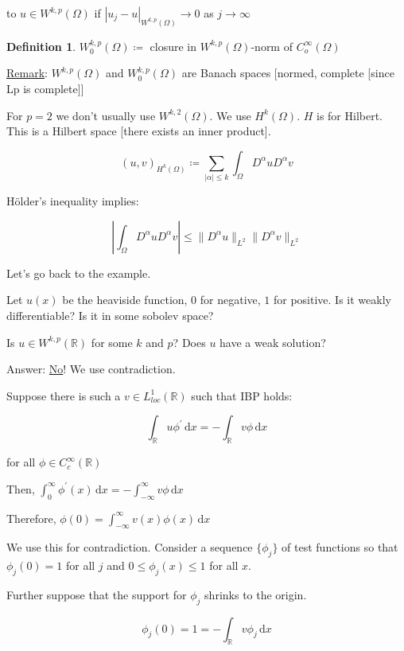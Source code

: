 \documentclass{article}
\theoremstyle{definition}
\newtheorem{definition}{Definition}
\begin{document}
to \(u\in W^{k,p}(\Omega)\) if \(\left\vert u_j - u \right\vert _{W^{k,p}(\Omega)} \to 0\) as \(j \to \infty\)  

\begin{definition}
    \(W^{k,p}_0(\Omega) \coloneqq \) closure in \(W^{k,p}(\Omega)\)-norm of \(C_o^{\infty}(\Omega)\) 
\end{definition}

\underline{Remark}: \(W^{k,p}(\Omega)\) and \(W^{k,p}_0(\Omega)\) are Banach spaces [normed, complete [since Lp is complete]]

For \(p = 2\) we don't usually use \(W^{k,2}(\Omega)\). We use \(H^k(\Omega)\). \(H\) is for Hilbert. This is a Hilbert space [there exists an inner product].

\[
    (u,v)_{H^k(\Omega)} \coloneqq \sum_{\vert \alpha  \vert \leq k} \int_{\Omega}^{} D^\alpha u D^\alpha v
\]

H\"older's inequality implies:

\[
    \left\vert \int _\Omega D^\alpha u D^\alpha v \right\vert \leq \lVert D^\alpha u \rVert _{L^2} \lVert D^\alpha v \rVert _{L^2}
\]

Let's go back to the example.

Let \(u(x)\) be the heaviside function, \(0\) for negative, \(1\) for positive. Is it weakly differentiable? Is it in some sobolev space?

Is \(u\in W^{k,p}(\mathbb{R})\) for some \(k\) and \(p\)? Does \(u\) have a weak solution?

Answer: \underline{No}! We use contradiction.

Suppose there is such a \(v\in L^1_{loc}(\mathbb{R})\) such that IBP holds:

\[
    \int_\mathbb{R} u \phi^{\prime} \, \mathrm{d} x = - \int _\mathbb{R} v \phi \, \mathrm{d} x
\]

for all \(\phi\in C_c^{\infty} (\mathbb{R})\) 

Then, \(\int_{0}^{\infty} \phi^{\prime} (x) \,\mathrm{d}x = - \int_{-\infty}^{\infty} v \phi \,\mathrm{d}x \) 

Therefore, \(\phi(0) = \int_{-\infty}^{\infty} v(x)\phi(x) \,\mathrm{d}x \) 

We use this for contradiction. Consider a sequence \(\{ \phi_j \} \) of test functions so that \(\phi_j(0)=1\) for all \(j\) and \(0 \leq \phi_j(x) \leq 1\) for all \(x\).

Further suppose that the support for \(\phi_j\) shrinks to the origin. 

\[
    \phi_j(0) = 1 = -\int_\mathbb{R} v\phi_j \, \mathrm{d} x
\]
\end{document}
